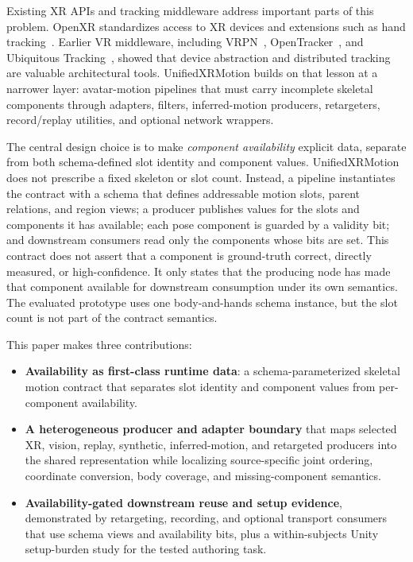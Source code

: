 \documentclass[runningheads]{llncs}
\begin{document}
Existing XR APIs and tracking middleware address important parts of this problem. OpenXR standardizes access to XR devices and extensions such as hand tracking~\cite{khronos_openxr_1_0,openxr_ext_hand}. Earlier VR middleware, including VRPN~\cite{taylor2001vrpn}, OpenTracker~\cite{reitmayr2001openarchitecture}, and Ubiquitous Tracking~\cite{newman2004ubiquitous}, showed that device abstraction and distributed tracking are valuable architectural tools. UnifiedXRMotion builds on that lesson at a narrower layer: avatar-motion pipelines that must carry incomplete skeletal components through adapters, filters, inferred-motion producers, retargeters, record/replay utilities, and optional network wrappers.

The central design choice is to make \emph{component availability} explicit data, separate from both schema-defined slot identity and component values. UnifiedXRMotion does not prescribe a fixed skeleton or slot count. Instead, a pipeline instantiates the contract with a schema that defines addressable motion slots, parent relations, and region views; a producer publishes values for the slots and components it has available; each pose component is guarded by a validity bit; and downstream consumers read only the components whose bits are set. This contract does not assert that a component is ground-truth correct, directly measured, or high-confidence. It only states that the producing node has made that component available for downstream consumption under its own semantics. The evaluated prototype uses one body-and-hands schema instance, but the slot count is not part of the contract semantics.

This paper makes three contributions:
\begin{itemize}
    \item \textbf{Availability as first-class runtime data}: a schema-parameterized skeletal motion contract that separates slot identity and component values from per-component availability.
    \item \textbf{A heterogeneous producer and adapter boundary} that maps selected XR, vision, replay, synthetic, inferred-motion, and retargeted producers into the shared representation while localizing source-specific joint ordering, coordinate conversion, body coverage, and missing-component semantics.
    \item \textbf{Availability-gated downstream reuse and setup evidence}, demonstrated by retargeting, recording, and optional transport consumers that use schema views and availability bits, plus a within-subjects Unity setup-burden study for the tested authoring task.
\end{itemize}
\end{document}
